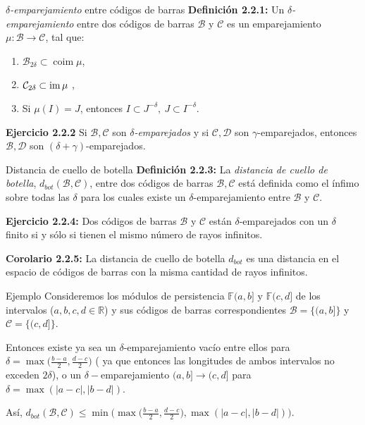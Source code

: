 \documentclass{beamer}
\newcounter{Ejercicio}
\DeclareMathOperator{\coim}{coim}
\newcommand{\calB}{{\mathcal{B}}}
\newcommand{\calC}{{\mathcal{C}}}
\newcommand{\calD}{{\mathcal{D}}}
\def\R{\mathbb{R}}
\def\F {\mathbb{F}}
\begin{document}
\begin{frame}{\emph{$\delta$-emparejamiento} entre códigos de barras}
    \textbf{Definición 2.2.1:} Un {\color{green}\emph{$\delta$-emparejamiento}} entre dos códigos de barras $\calB$ y $\calC$ es un emparejamiento $\mu : {\calB}\to {\calC}$, tal que:
	\begin{enumerate}
		\item
			${\calB}_{2\delta} \subset \coim \mu$,
		\item
			${\calC}_{2\delta} \subset \im \mu$ ,
		\item
			Si $\mu (I) = J$, entonces $I \subset J^{-\delta},\ J \subset I^{-\delta}$. \\[0.4cm] \pause
	\end{enumerate}

 \textbf{Ejercicio 2.2.2} Si $\calB, \calC$ son \emph{$\delta$-emparejados} y si $\calC, \calD$ son $\gamma$-emparejados, entonces $\calB, \calD$ son $(\delta+\gamma)$-emparejados.
\end{frame}

\begin{frame}{Distancia de cuello de botella}
    \textbf{Definición 2.2.3:} La {\color{green}\emph{distancia de cuello de botella}}, $d_{bot} (\calB, \calC)$, entre dos códigos de barras $\calB, \calC$ está definida como el ínfimo sobre todas las $\delta$ para los cuales existe un $\delta$-emparejamiento entre $\calB$ y $\calC$. \\[0.4cm] \pause

    \textbf{Ejercicio 2.2.4:} Dos códigos de barras $\calB$ y $\calC$ están $\delta$-emparejados con un $\delta$ finito si y sólo si tienen el mismo número de rayos infinitos. \\[0.4cm] \pause

    \textbf{Corolario 2.2.5:} La distancia de cuello de botella $d_{bot}$ es una distancia en el espacio de códigos de barras con la misma cantidad de rayos infinitos.

\end{frame}

\begin{frame}{Ejemplo}
    Consideremos los módulos de persistencia $\F(a,b] \text{ y } \F(c,d]$ de los intervalos ($a,b,c,d\in \R$) y sus códigos de barras correspondientes $\calB =\{ (a,b] \}$ y $\calC = \{ (c,d] \}$. \\ \pause
    
	Entonces existe ya sea un $\delta$-emparejamiento vacío entre ellos para $\delta = \max \big( \frac{b-a}{2}, \frac{d-c}{2} \big)$ ( ya que entonces las longitudes de ambos intervalos no exceden $2\delta$), o un $\delta-$emparejamiento $(a,b] \to (c,d]$  para $\delta = \max (|a-c|, |b-d|)$. \\ \pause
 
 Así, $d_{bot} (\calB, \calC ) \leq \min \Big( \max \big( \frac{b-a}{2}, \frac{d-c}{2} \big), \max (|a-c|, |b-d|) \Big)$.
\end{frame}
\end{document}
